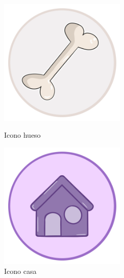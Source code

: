 \documentclass[a4paper, 12pt]{article}
\begin{document}
\begin{figure}[H]
   	\begin{minipage}{0.48\textwidth}
		\begin{center}
			{\includegraphics[width=6cm]{Protectora.png}\par}
			\caption{Icono hueso}
		\end{center}  
	\end{minipage}\hfill
   	\begin{minipage}{0.48\textwidth}
		\begin{center}
			{\includegraphics[width=6cm]{Casa.png}\par}
			\caption{Icono casa}
		\end{center}  
	\end{minipage}\hfill
\end{figure}
\end{document}
